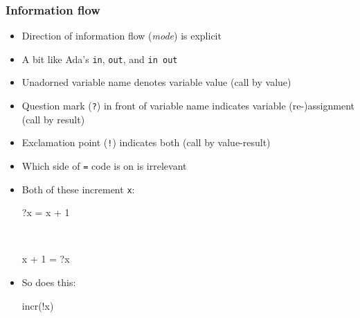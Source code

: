 \documentclass[12pt]{beamer}
\begin{document}
\begin{frame}[fragile]
\frametitle{Information flow}
\begin{itemize}
\item Direction of information flow (\emph{mode}) is explicit
\item A bit like Ada's \texttt{in}, \texttt{out}, and \texttt{in out}
\item Unadorned variable name denotes variable value (call by value)
\item Question mark (\alert<2>{\texttt{?}}) in front of variable name indicates
  variable (re-)assignment (call by result)
\item Exclamation point (\alert<3>{\texttt{!}}) indicates both (call by value-result)
\item Which side of \texttt{=} code is on is irrelevant
\item Both of these increment \texttt{x}: \\[-1ex]
  \begin{minipage}{0.95\linewidth}
    \begin{block}{}
\begin{semiverbatim}
?x = x + 1
\end{semiverbatim}
    \end{block}
  \end{minipage} \\[-1ex]
  \begin{minipage}{0.95\linewidth}
    \begin{block}{}
\begin{semiverbatim}
x + 1 = ?x
\end{semiverbatim}
    \end{block}
  \end{minipage}
  \begin{minipage}[c]{0.4\linewidth}
  \end{minipage}
\item So does this: \\[-1ex]
  \begin{minipage}{0.95\linewidth}
    \begin{block}{}
\begin{semiverbatim}
incr(!x)
\end{semiverbatim}
    \end{block}
  \end{minipage}
\end{itemize}
\end{frame}
\end{document}
